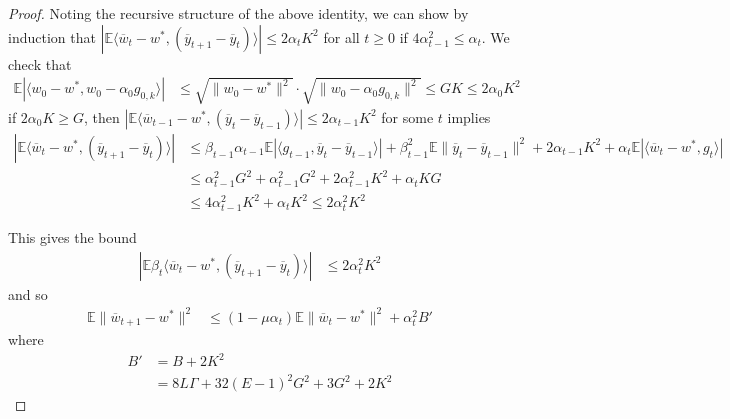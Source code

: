\begin{proof}
	Noting the recursive structure of the above identity, we can show
	by induction that $|\mathbb{E}\langle\overline{w}_{t}-w^{\ast},(\overline{y}_{t+1}-\overline{y}_{t})\rangle|\leq2\alpha_{t}K^{2}$\textbf{
	}for all $t\geq0$ if $4\alpha_{t-1}^{2}\leq\alpha_{t}$. We check
	that 
	\begin{align*}
	\mathbb{E}|\langle w_{0}-w^{\ast},w_{0}-\alpha_{0}g_{0,k}\rangle| & \leq\sqrt{\|w_{0}-w^{\ast}\|^{2}}\cdot\sqrt{\|w_{0}-\alpha_{0}g_{0,k}\|^{2}}\leq GK\leq2\alpha_{0}K^{2}
	\end{align*}
	if $2\alpha_{0}K\geq G$, then $|\mathbb{E}\langle\overline{w}_{t-1}-w^{\ast},(\overline{y}_{t}-\overline{y}_{t-1})\rangle|\leq2\alpha_{t-1}K^{2}$
	for some $t$ implies 
	\begin{align*}
	|\mathbb{E}\langle\overline{w}_{t}-w^{\ast},(\overline{y}_{t+1}-\overline{y}_{t})\rangle| & \leq\beta_{t-1}\alpha_{t-1}\mathbb{E}|\langle g_{t-1},\overline{y}_{t}-\overline{y}_{t-1}\rangle|+\beta_{t-1}^{2}\mathbb{E}\|\overline{y}_{t}-\overline{y}_{t-1}\|^{2}+2\alpha_{t-1}K^{2}+\alpha_{t}\mathbb{E}|\langle\overline{w}_{t}-w^{\ast},g_{t}\rangle|\\
	& \leq\alpha_{t-1}^{2}G^{2}+\alpha_{t-1}^{2}G^{2}+2\alpha_{t-1}^{2}K^{2}+\alpha_{t}KG\\
	& \leq4\alpha_{t-1}^{2}K^{2}+\alpha_{t}K^{2}\leq2\alpha_{t}^{2}K^{2}
	\end{align*}
	
	This gives the bound
	\begin{align*}
	|\mathbb{E}\beta_{t}\langle\overline{w}_{t}-w^{\ast},(\overline{y}_{t+1}-\overline{y}_{t})\rangle| & \leq2\alpha_{t}^{2}K^{2}
	\end{align*}
	and so
	\begin{align*}
	\mathbb{E}\|\overline{w}_{t+1}-w^{\ast}\|^{2} & \leq(1-\mu\alpha_{t})\mathbb{E}\|\overline{w}_{t}-w^{\ast}\|^{2}+\alpha_{t}^{2}B'
	\end{align*}
	where 
	\begin{align*}
	B' & =B+2K^{2}\\
	& =8L\Gamma+32(E-1)^{2}G^{2}+3G^{2}+2K^{2}
	\end{align*}
	

\end{proof}
